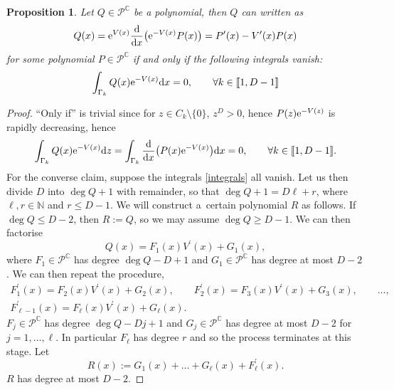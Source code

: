 \documentclass[pdftex]{sigma}
\numberwithin{equation}{section}
\newtheorem{Proposition}[Theorem]{Proposition}
\begin{document}
\begin{Proposition}\label{representation} Let $Q \in \mathscr{P}^\mathbb{C}$ be a polynomial, then $Q$ can written as
\begin{equation*}
Q(x) = {\rm e}^{V(x)} \frac{\rm d}{{\rm d}x}\big({\rm e}^{-V(x)} P(x) \big) = P^\prime(x) - V^\prime(x) P(x)
\end{equation*}
for some polynomial $P \in \mathscr{P}^\mathbb{C}$ if and only if the following integrals vanish:
\begin{align}\label{integrals}
\int_{\Gamma_k} Q(x){\rm e}^{-V(x)} {\rm d}x = 0,\qquad \forall k \in [\![ 1,D-1]\!]
\end{align}
\end{Proposition}
\begin{proof}
\enquote{Only if} is trivial since for $z \in C_k \setminus \{ 0 \}$, $z^{D} > 0$, hence $P(z){\rm e}^{-V(z)}$ is rapidly decreasing, hence
\begin{align*}
\int_{\Gamma_k} Q(x){\rm e}^{-V(x)} {\rm d}z = \int_{\Gamma_k} \frac{\rm d}{{\rm d}x}\big(P(x){\rm e}^{-V(x)}\big) {\rm d}x =0,\qquad \forall k \in [\![ 1,D-1]\!].
\end{align*}
For the converse claim, suppose the integrals \eqref{integrals} all vanish. Let us then divide $D$ into ${\deg Q+1}$ with remainder, so that $\deg Q+1 = D \ell + r$, where $\ell , r \in \mathbb{N}$ and $r \leq D-1$. We will construct a~certain polynomial $R$ as follows. If $\deg Q \leq D-2$, then $R:=Q$, so we may assume ${\deg Q \geq D-1}$. We can then factorise
\begin{equation*}
Q(x) = F_1 (x) V^\prime(x) + G_1(x),
\end{equation*}
where $F_1 \in \mathscr{P}^\mathbb{C}$ has degree $\deg Q - D+1$ and $G_1 \in \mathscr{P}^\mathbb{C}$ has degree at most $D-2$. We can then repeat the procedure,
\begin{gather*}
F_1^\prime(x) = F_2(x) V^\prime(x) + G_2(x), \qquad
F_2^\prime(x)= F_3(x) V^\prime(x) + G_3(x),\qquad \ldots, \\
F_{\ell-1}^\prime(x) = F_{\ell}(x) V^\prime(x) + G_{\ell}(x).
\end{gather*}
$F_j \in \mathscr{P}^\mathbb{C}$ has degree $\deg Q-Dj+1$ and $G_j \in \mathscr{P}^\mathbb{C}$ has degree at most $D-2$ for $j=1, \dots , \ell$. In particular $F_\ell$ has degree $r$ and so the process terminates at this stage. Let
\begin{equation*}
R(x) := G_1(x) + \dots + G_\ell(x) + F_\ell^\prime(x).
\end{equation*}
$R$ has degree at most $D-2$.


\end{proof}
\end{document}

